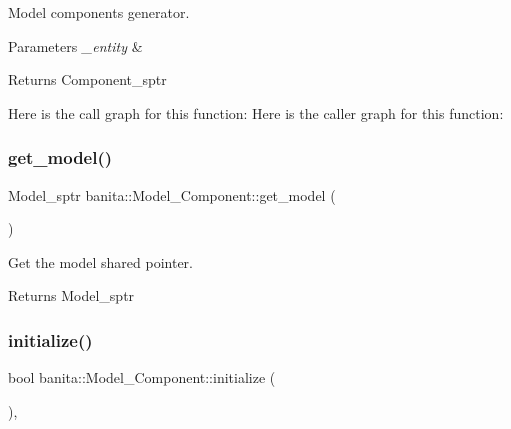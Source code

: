 Model component\textquotesingle{}s generator. 


\begin{DoxyParams}{Parameters}
{\em \+\_\+entity} & \\
\hline
\end{DoxyParams}
\begin{DoxyReturn}{Returns}
Component\+\_\+sptr 
\end{DoxyReturn}
Here is the call graph for this function\+:
Here is the caller graph for this function\+:
\mbox{\label{classbanita_1_1_model___component_ae0c1a224521a196fad83dcc09e34097b}} 
\subsubsection{\texorpdfstring{get\_model()}{get\_model()}}
{\footnotesize\ttfamily Model\+\_\+sptr banita\+::\+Model\+\_\+\+Component\+::get\+\_\+model (\begin{DoxyParamCaption}{ }\end{DoxyParamCaption})\hspace{0.3cm}{\ttfamily [inline]}}



Get the model shared pointer. 

\begin{DoxyReturn}{Returns}
Model\+\_\+sptr 
\end{DoxyReturn}
\mbox{\label{classbanita_1_1_model___component_af87c47483437405822718949a448bc14}} 
\subsubsection{\texorpdfstring{initialize()}{initialize()}}
{\footnotesize\ttfamily bool banita\+::\+Model\+\_\+\+Component\+::initialize (\begin{DoxyParamCaption}{ }\end{DoxyParamCaption})\hspace{0.3cm}{\ttfamily [override]}, {\ttfamily [virtual]}}



